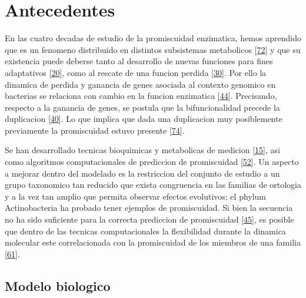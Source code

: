 \documentclass[12pt,twoside]{reedthesis}
\begin{document}
  \section{Antecedentes}\label{antecedentes}
  
  En las cuatro decadas de estudio de la promiscuidad enzimatica, hemos
  aprendido que es un fenomeno distribuido en distintos subsistemas
  metabolicos {[}\protect\hyperlink{ref-namux5fnetworkux5f2012}{72}{]} y
  que su existencia puede deberse tanto al desarrollo de nuevas funciones
  para fines adaptativos
  {[}\protect\hyperlink{ref-jensenux5fenzymeux5f1976}{20}{]}, como al
  rescate de una funcion perdida
  {[}\protect\hyperlink{ref-patrickux5fmulticopyux5f2007}{30}{]}. Por ello
  la dinamica de perdida y ganancia de genes asociada al contexto genomico
  en bacterias se relaciona con cambio en la funcion enzimatica
  {[}\protect\hyperlink{ref-zhaoux5fdiscoveryux5f2013}{44}{]}. Precisando,
  respecto a la ganancia de genes, se postula que la bifuncionalidad
  precede la duplicacion
  {[}\protect\hyperlink{ref-hughesux5fevolutionux5f1994}{40}{]}. Lo que
  implica que dada una duplicacion muy posiblemente previamente la
  promiscuidad estuvo presente
  {[}\protect\hyperlink{ref-gerltux5fdivergentux5f2001}{74}{]}.
  
  Se han desarrollado tecnicas bioquimicas y metabolicas de medicion
  {[}\protect\hyperlink{ref-nathux5fquantitativeux5f2008}{15}{]}, asi como
  algoritmos computacionales de prediccion de promiscuidad
  {[}\protect\hyperlink{ref-carbonellux5fmolecularux5f2010}{52}{]}. Un
  aspecto a mejorar dentro del modelado es la restriccion del conjunto de
  estudio a un grupo taxonomico tan reducido que exista congruencia en las
  familias de ortologia y a la vez tan amplio que permita observar efectos
  evolutivos; el phylum Actinobacteria ha probado tener ejemplos de
  promiscuidad. Si bien la secuencia no ha sido suficiente para la
  correcta prediccion de promiscuidad
  {[}\protect\hyperlink{ref-verdel-arandaux5fmolecularux5f2015}{45}{]}, es
  posible que dentro de las tecnicas computacionales la flexibilidad
  durante la dinamica molecular este correlacionada con la promiscuidad de
  los miembros de una familia
  {[}\protect\hyperlink{ref-jamesux5fconformationalux5f2003}{61}{]}.
  
  \subsection{Modelo biologico}\label{modelo-biologico}
  
\end{document}

